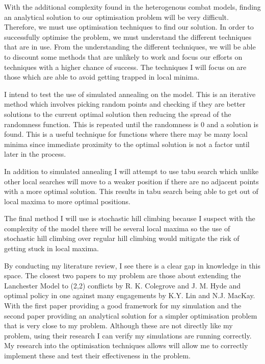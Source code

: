 With the additional complexity found in the heterogenous combat models, finding an analytical solution to our optimisation problem will be very difficult. Therefore, we must use optimisation techniques to find our solution. In order to successfully optimise the problem, we must understand the different techniques that are in use. From the understanding the different techniques, we will be able to discount some methods that are unlikely to work and focus our efforts on techniques with a higher chance of success.
The techniques I will focus on are those which are able to avoid getting trapped in local minima.

I intend to test the use of simulated annealing on the model. This is an iterative method which involves picking random points and checking if they are better solutions to the current optimal solution then reducing the spread of the randomness function. This is repeated until the randomness is 0 and a solution is found. This is a useful technique for functions where there may be many local minima since immediate proximity to the optimal solution is not a factor until later in the process.\cite{Connolly1992}

In addition to simulated annealing I will attempt to use tabu search which unlike other local searches will move to a weaker position if there are no adjacent points with a more optimal solution. This results in tabu search being able to get out of local maxima to more optimal positions. \cite{Gendreau2003}

The final method I will use is stochastic hill climbing because I suspect with the complexity of the model there will be several local maxima so the use of stochastic hill climbing over regular hill climbing would mitigate the risk of getting stuck in local maxima.\cite{shillclimbing}

By conducting my literature review, I see there is a clear gap in knowledge in this space. The closest two papers to my problem are those about extending the Lanchester Model to (2,2) conflicts by R. K. Colegrove and J. M. Hyde and optimal policy in one against many engagements by K.Y. Lin and N.J. MacKay. With the first paper providing a good framework for my simulation and the second paper providing an analytical solution for a simpler optimisation problem that is very close to my problem. Although these are not directly like my problem, using their research I can verify my simulations are running correctly. My research into the optimisation techniques allows will allow me to correctly implement these and test their effectiveness in the problem.
